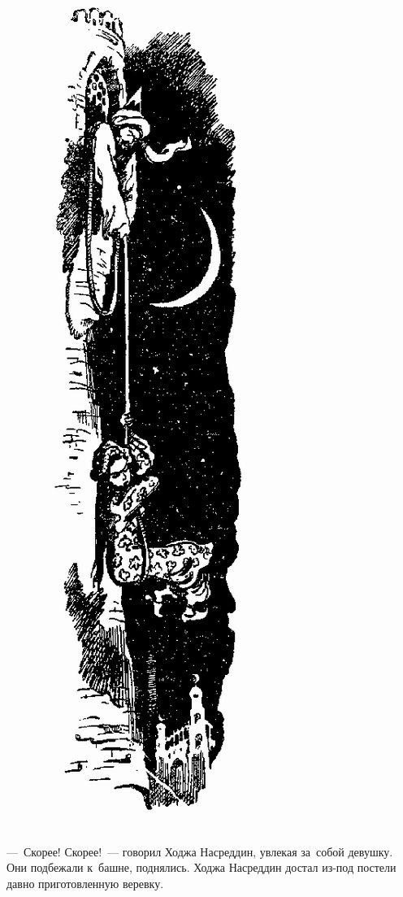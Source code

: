 \documentclass[12pt,a4paper]{book}
\begin{document}
\begin{figure}[p]
\centering
\includegraphics[scale=0.55]{17.png}
\end{figure}

—~Скорее! Скорее!~— говорил Ходжа Насреддин, увлекая за~собой девушку. Они подбежали к~башне, поднялись. Ходжа Насреддин достал из-под постели давно приготовленную веревку.
\end{document}
